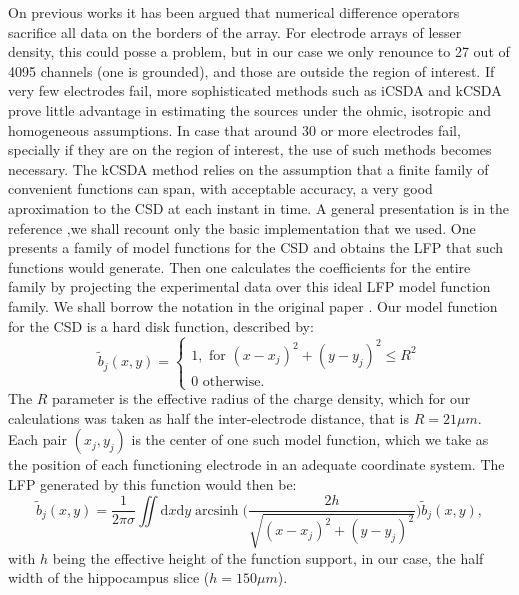 \documentclass[12pt]{article}
\DeclareMathOperator{\arcsinh}{arcsinh}
\newcommand{\rd}{\mathrm{d}}
\begin{document}
On previous works it has been argued that numerical difference operators sacrifice all data on the borders of the array. For electrode arrays of lesser density, this could posse a problem, but in our case we only renounce to 27 out of 4095 channels (one is grounded), and those are outside the region of interest.
If very few electrodes fail, more sophisticated methods such as iCSDA \cite{Leski2011} and kCSDA \cite{Potworowski2011} prove little advantage in estimating the sources under the ohmic, isotropic and homogeneous assumptions. In case that around 30 or more electrodes
fail, specially if they are on the region of interest, the use of such methods
becomes necessary. The kCSDA method relies on the
assumption that a finite family of convenient functions can span, with acceptable accuracy, a very good aproximation to the  CSD at each instant in time.
 A general presentation is in the reference \cite{Potworowski2011},we shall recount only the basic implementation that we used.
One presents a family of model functions for the CSD and
obtains the LFP that such functions
would generate. Then one calculates the coefficients for the entire family by projecting the
experimental data over this ideal LFP model function family.
We shall borrow the notation in the original paper \cite{Potworowski2011}. Our model function for the CSD is a hard disk function, described by:
\begin{equation}
  \tilde{b}_j(x,y)=\begin{cases}
  1, \text{ for } (x-x_j)^2+(y-y_j)^2 \leq R^2 \\
  0 \text{ otherwise.} 
  \end{cases}
\end{equation}
The $R$ parameter is the effective radius of the charge density, which for our
calculations was taken as half the inter-electrode distance, that is $R=21 \mu m$.
Each pair $(x_j, y_j)$ is the center of one such model function, which we take as
the position of each  functioning electrode in an adequate coordinate system.
The LFP generated by this function would then be:
\begin{equation}
  \tilde{b}_j(x,y)=\frac{1}{2\pi\sigma}
  \iint \! \rd x \rd y \arcsinh \biggr(
  \frac{2 h } {\sqrt{(x-x_j)^2+(y-y_j)^2}}
  \biggl)
  \tilde{b}_j(x,y),
\end{equation}
  with $h$ being the effective height of the function support, in our case,
  the half width of the hippocampus slice ($h=150 \mu m$).
\end{document}
